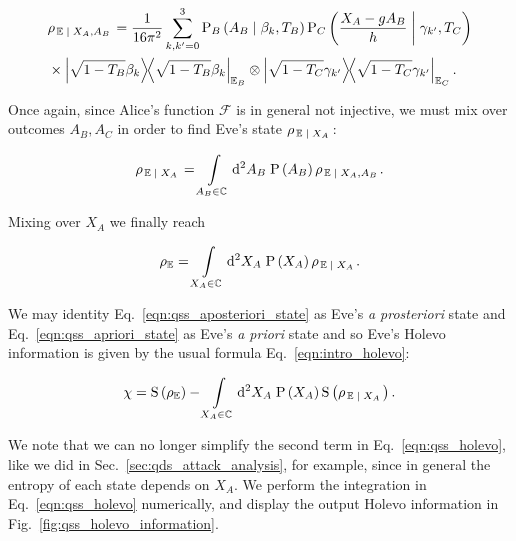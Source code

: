 \begin{align}\label{eqn:qss_deriv_8}
&\rho_{\left. \mathbb{E} \given X_A, A_B\right.} = \frac{1}{16 \pi^2} \sum_{k, k^\prime = 0}^3 \text{P}_B\left(A_B \given \beta_k, T_B\right) \text{P}_C\left(\frac{X_A - g A_B}{h} \given \gamma_{k^\prime}, T_C\right) \notag \\
%
&\times \dyad{\sqrt{1-T_B} \beta_k}_{\mathbb{E}_B} \otimes \dyad{\sqrt{1-T_C}\gamma_{k^\prime}}_{\mathbb{E}_C}.
\end{align}

\noindent Once again, since Alice's function $\mathcal{F}$ is in general not injective, we must mix over outcomes $A_B, A_C$ in order to find Eve's state $\rho_{\left.\mathbb{E} \; \middle| \; X_A\right.}$:

\begin{equation}\label{eqn:qss_aposteriori_state}
\rho_{\left.\mathbb{E} \; \middle| \; X_A\right.} = \int\limits_{A_B \in \mathbb{C}} \mathop{}\!\mathrm{d^2} A_B \; \text{P}\left(A_B\right) \rho_{\left.\mathbb{E} \; \middle| \; X_A, A_B\right.}.
\end{equation}

\noindent Mixing over $X_A$ we finally reach

\begin{equation}\label{eqn:qss_apriori_state}
\rho_{\mathbb{E}} = \int\limits_{X_A \in \mathbb{C}} \mathop{}\!\mathrm{d^2} X_A \; \text{P}\left(X_A\right) \rho_{\left.\mathbb{E}\; \middle| \; X_A\right.}.
\end{equation}

\noindent We may identity Eq.~\ref{eqn:qss_aposteriori_state} as Eve's \emph{a prosteriori} state and Eq.~\ref{eqn:qss_apriori_state} as Eve's \emph{a priori} state and so Eve's Holevo information is given by the usual formula Eq.~\ref{eqn:intro_holevo}:

\begin{equation}\label{eqn:qss_holevo}
\chi = \text{S}\left(\rho_\mathbb{E}\right) - \int\limits_{X_A \in \mathbb{C}} \mathop{}\!\mathrm{d^2} X_A \; \text{P}\left(X_A\right) \text{S}\left(\rho_{\left.\mathbb{E} \; \middle| \; X_A\right.}\right).
\end{equation}

\noindent We note that we can no longer simplify the second term in Eq.~\ref{eqn:qss_holevo}, like we did in Sec.~\ref{sec:qds_attack_analysis}, for example, since in general the entropy of each state depends on $X_A$. We perform the integration in Eq.~\ref{eqn:qss_holevo} numerically, and display the output Holevo information in Fig.~\ref{fig:qss_holevo_information}.


